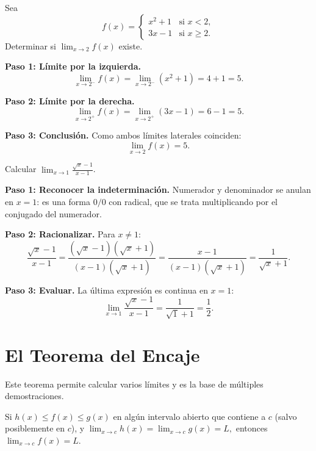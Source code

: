 \begin{example}[Límite de función definida por partes en $x=2$]
Sea
\[
  f(x) =
  \begin{cases}
    x^2+1 & \text{si } x < 2,\\
    3x-1  & \text{si } x \geq 2.
  \end{cases}
\]
Determinar si $\lim_{x\to 2}f(x)$ existe.

\begin{myproof}
\textbf{Paso 1: Límite por la izquierda.}
\[
  \lim_{x\to 2^-}f(x) = \lim_{x\to 2^-}(x^2+1) = 4+1 = 5.
\]

\textbf{Paso 2: Límite por la derecha.}
\[
  \lim_{x\to 2^+}f(x) = \lim_{x\to 2^+}(3x-1) = 6-1 = 5.
\]

\textbf{Paso 3: Conclusión.} Como ambos límites laterales coinciden:
\[
  \boxed{\lim_{x\to 2}f(x) = 5.}
\]
\end{myproof}
\end{example}

\begin{example}
Calcular $\displaystyle\lim_{x\to 1}\frac{\sqrt{x}-1}{x-1}$.

\begin{myproof}
\textbf{Paso 1: Reconocer la indeterminación.} Numerador y denominador se
anulan en $x=1$: es una forma $0/0$ con radical, que se trata multiplicando
por el conjugado del numerador.

\textbf{Paso 2: Racionalizar.} Para $x\neq 1$:
\[
  \frac{\sqrt{x}-1}{x-1}
  = \frac{(\sqrt{x}-1)(\sqrt{x}+1)}{(x-1)(\sqrt{x}+1)}
  = \frac{x-1}{(x-1)(\sqrt{x}+1)}
  = \frac{1}{\sqrt{x}+1}.
\]

\textbf{Paso 3: Evaluar.} La última expresión es continua en $x=1$:
\[
  \boxed{\lim_{x\to 1}\frac{\sqrt{x}-1}{x-1}
  = \frac{1}{\sqrt{1}+1} = \frac{1}{2}.}
\]
\end{myproof}
\end{example}

\section{El Teorema del Encaje}

Este teorema permite calcular varios límites y es la base de múltiples
demostraciones.

\begin{theorem}
Si $h(x)\leq f(x)\leq g(x)$ en algún intervalo abierto que contiene a
$c$ (salvo posiblemente en $c$), y
\(
  \lim_{x\to c}h(x) = \lim_{x\to c}g(x) = L,
\)
entonces $\lim_{x\to c}f(x)=L$.
\end{theorem}

